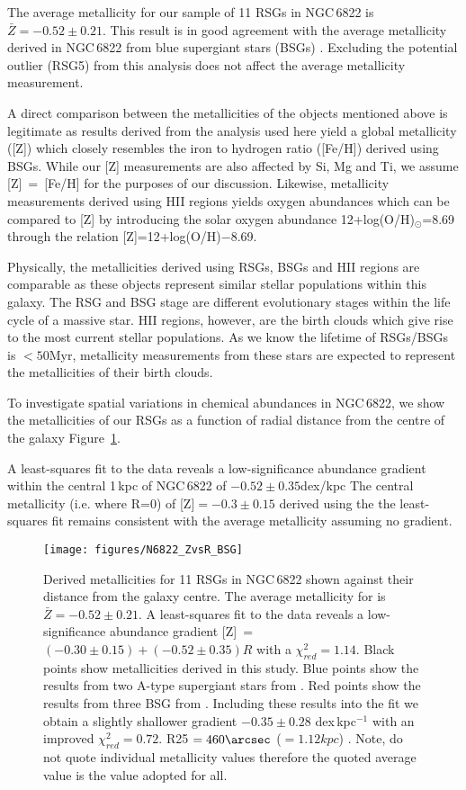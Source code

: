 \documentclass[iop]{emulateapj}
\def\2{\footnotesize II\normalsize}
\begin{document}
The average metallicity for our sample of 11 RSGs in NGC\,6822 is
$\bar{Z} = -0.52\pm 0.21$.
This result is in good agreement with the average metallicity derived in
NGC\,6822 from blue supergiant stars (BSGs)
\citep{1999A&A...352L..40M,2001ApJ...547..765V}.
Excluding the potential outlier (RSG5) from this analysis does not affect the average metallicity measurement.

A direct comparison between the metallicities of the objects mentioned above is legitimate as results derived from the analysis used here yield a global metallicity ([Z]) which
closely resembles the iron to hydrogen ratio ([Fe/H]) derived using BSGs.
While our [Z] measurements are also affected by Si, Mg and Ti,
we assume [Z]~=~[Fe/H] for the purposes of our discussion.
Likewise, metallicity measurements derived using H\2 regions yields oxygen abundances which can be compared
to [Z] by introducing the solar oxygen abundance
{12+log(O/H)}$_{\odot}$=8.69
\citep{2009ARA&A..47..481A} through the relation
[Z]=12+log(O/H)$-$8.69.

Physically, the metallicities derived using RSGs, BSGs and H\2 regions are comparable as these objects represent similar stellar populations within this galaxy.
The RSG and BSG stage are different evolutionary stages within the life cycle of a massive star.
H\2 regions, however, are the birth clouds which give rise to the most current stellar populations.
As we know the lifetime of RSGs/BSGs is $<50$Myr,
metallicity measurements from these stars are expected to represent the metallicities of their birth clouds.

To investigate spatial variations in chemical abundances in NGC\,6822, we show the metallicities of our RSGs as a function of radial distance from the centre of the galaxy 
Figure~\ref{fig:ZvsR}.

A least-squares fit to the data reveals a low-significance abundance gradient within the central 1\,kpc of NGC\,6822 of $-0.52\pm0.35$dex/kpc
The central metallicity (i.e. where R=0) of [Z]$=-0.3\pm0.15$ derived using the the least-squares fit remains consistent with the average metallicity assuming no gradient.

\begin{figure}
\texttt{[image: figures/N6822\_ZvsR\_BSG]}
\caption{
Derived metallicities for 11 RSGs in NGC\,6822 shown against their distance from the galaxy centre.
The average metallicity for is
$\bar{Z} = -0.52\pm 0.21$.
A least-squares fit to the data reveals a low-significance abundance gradient
[Z]~=~$(-0.30\pm0.15)+(-0.52\pm0.35)R$ with a $\chi^{2}_{red}=1.14$.
Black points show metallicities derived in this study.
Blue points show the results from two A-type supergiant stars from
\protect\cite{2001ApJ...547..765V}.
Red points show the results from three BSG from
\protect\cite{1999A&A...352L..40M}.
Including these results into the fit we obtain a slightly shallower gradient
$-0.35\pm0.28$ dex\,kpc$^{-1}$ with an improved $\chi^{2}_{red}=0.72$.
R25 $= 460 \arcsec$ ($=1.12kpc$)
\citep{2012AJ....144....4M}.
Note,
\cite{1999A&A...352L..40M} do not quote individual metallicity values therefore the quoted average value is the value adopted for all.
        }
\label{fig:ZvsR}
\end{figure}
\end{document}
